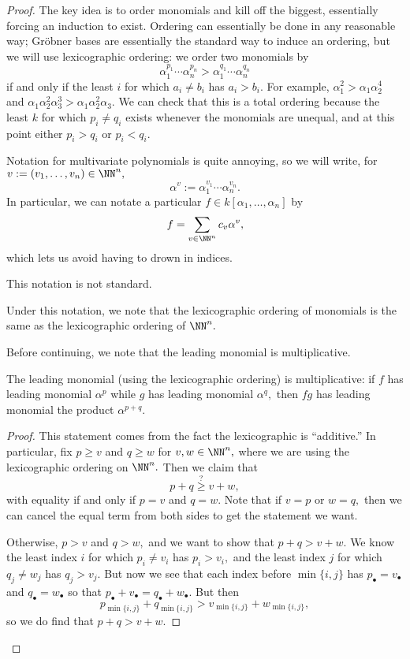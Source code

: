 \begin{proof}
	The key idea is to order monomials and kill off the biggest, essentially forcing an induction to exist. Ordering can essentially be done in any reasonable way; Gr\"obner bases are essentially the standard way to induce an ordering, but we will use lexicographic ordering: we order two monomials by
	\[\alpha_1^{p_1}\cdots\alpha_n^{p_n}>\alpha_1^{q_1}\cdots\alpha_n^{q_n}\]
	if and only if the least $i$ for which $a_i\ne b_i$ has $a_i>b_i.$ For example, $\alpha_1^2>\alpha_1\alpha_2^4$ and $\alpha_1\alpha_2^2\alpha_3^3>\alpha_1\alpha_2^2\alpha_3.$ We can check that this is a total ordering because the least $k$ for which $p_i\ne q_i$ exists whenever the monomials are unequal, and at this point either $p_i>q_i$ or $p_i<q_i.$

	Notation for multivariate polynomials is quite annoying, so we will write, for $v:=(v_1,\ldots,v_n)\in\NN^n,$
	\[\alpha^v:=\alpha_1^{v_1}\cdots\alpha_n^{v_n}.\]
	In particular, we can notate a particular $f\in k[\alpha_1,\ldots,\alpha_n]$ by
	\[f=\sum_{v\in\NN^n}c_v\alpha^v,\]
	which lets us avoid having to drown in indices.
	\begin{warn}[Nir]
		This notation is not standard.
	\end{warn}
	Under this notation, we note that the lexicographic ordering of monomials is the same as the lexicographic ordering of $\NN^n.$
	
	Before continuing, we note that the leading monomial is multiplicative.
	\begin{lemma} \label{lem:multileadingcoef}
		The leading monomial (using the lexicographic ordering) is multiplicative: if $f$ has leading monomial $\alpha^p$ while $g$ has leading monomial $\alpha^q,$ then $fg$ has leading monomial the product $\alpha^{p+q}.$
	\end{lemma}
	\begin{proof}
		This statement comes from the fact the lexicographic is ``additive.'' In particular, fix $p\ge v$ and $q\ge w$ for $v,w\in\NN^n,$ where we are using the lexicographic ordering on $\NN^n.$ Then we claim that
		\[p+q\stackrel?\ge v+w,\]
		with equality if and only if $p=v$ and $q=w.$ Note that if $v=p$ or $w=q,$ then we can cancel the equal term from both sides to get the statement we want.
		
		Otherwise, $p>v$ and $q>w,$ and we want to show that $p+q>v+w.$ We know the least index $i$ for which $p_i\ne v_i$ has $p_i>v_i,$ and the least index $j$ for which $q_j\ne w_j$ has $q_j>v_j.$ But now we see that each index before $\min\{i,j\}$ has $p_\bullet=v_\bullet$ and $q_\bullet=w_\bullet$ so that $p_\bullet+v_\bullet=q_\bullet+w_\bullet.$ But then
		\[p_{\min\{i,j\}}+q_{\min\{i,j\}}>v_{\min\{i,j\}}+w_{\min\{i,j\}},\]
		so we do find that $p+q>v+w.$


\end{proof}
\end{proof}
